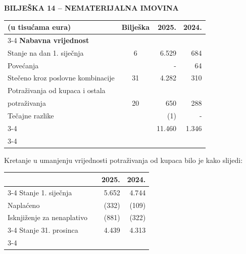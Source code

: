 \documentclass[a4paper,10pt]{article}
\begin{document}
{\large\bfseries BILJEŠKA 14 -- NEMATERIJALNA IMOVINA}

\vspace{1.5em}
{\small
\begin{tabular}{@{}p{6.5cm}crr@{}}
(u tisućama eura) & Bilješka & 2025. & 2024. \\ \cline{3-4}
\textbf{Nabavna vrijednost} & & & \\
Stanje na dan 1. siječnja & 6 & 6.529 & 684 \\
Povećanja & & - & 64 \\
Stečeno kroz poslovne kombinacije & 31 & 4.282 & 310 \\
Potraživanja od kupaca i ostala & & & \\
potraživanja & 20 & 650 & 288 \\
Tečajne razlike & & (1) & - \\ \cline{3-4}
 & & 11.460 & 1.346 \\ \cline{3-4}
\end{tabular}}

\vspace{2em}
Kretanje u umanjenju vrijednosti potraživanja od kupaca bilo je kako slijedi:

\vspace{1em}
{\small
\begin{tabular}{@{}p{6.5cm}crr@{}}
 & & 2025. & 2024. \\ \cline{3-4}
Stanje 1. siječnja & & 5.652 & 4.744 \\
Naplaćeno & & (332) & (109) \\
Isknjiženje za nenaplativo & & (881) & (322) \\ \cline{3-4}
Stanje 31. prosinca & & 4.439 & 4.313 \\ \cline{3-4}
\end{tabular}}
\end{document}
